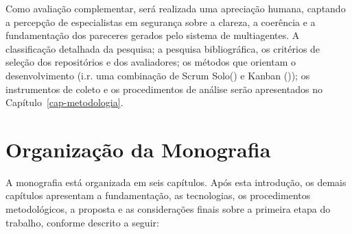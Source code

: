 Como avaliação complementar, será realizada uma apreciação humana, captando a percepção de especialistas em segurança sobre a clareza, a coerência e a fundamentação dos pareceres gerados pelo sistema de multiagentes. A classificação detalhada da pesquisa; a pesquisa bibliográfica, os critérios de seleção dos repositórios e dos avaliadores; os métodos que orientam o desenvolvimento (i.r. uma combinação de Scrum Solo() e Kanban ()); os instrumentos de coleto e os procedimentos de análise serão apresentados no Capítulo~\ref{cap-metodologia}.

\section{Organização da Monografia}
\label{1-organizacao}

A monografia está organizada em seis capítulos. Após esta introdução, os demais capítulos apresentam a fundamentação, as tecnologias, os procedimentos metodológicos, a proposta e as considerações finais sobre a primeira etapa do trabalho, conforme descrito a seguir:

